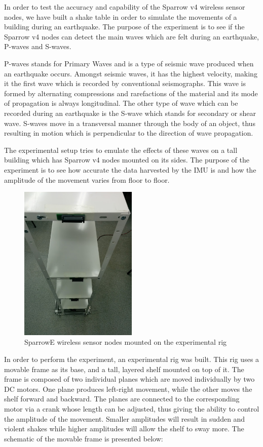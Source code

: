 In order to test the accuracy and capability of the Sparrow v4 wireless sensor nodes, we 
have built a shake table in order to simulate the movements of a building during an earthquake.
The purpose of the experiment is to see if the Sparrow v4 nodes can detect the main waves which 
are felt during an earthquake, P-waves and S-waves.

P-waves stands for Primary Waves and is a type of seismic wave produced when an earthquake occurs.
Amongst seismic waves, it has the highest velocity, making it the first wave which is recorded by 
conventional seismographs. This wave is formed by alternating compressions and rarefactions of the 
material and its mode of propagation is always longitudinal. The other type of wave which can be 
recorded during an earthquake is the S-wave which stands for secondary or shear wave. S-waves move 
in a transversal manner through the body of an object, thus resulting in motion which is perpendicular 
to the direction of wave propagation. 

The experimental setup tries to emulate the effects of these waves on a tall building which has Sparrow v4 
nodes mounted on its sides. The purpose of the experiment is to see how accurate the data harvested by the 
IMU is and how the amplitude of the movement varies from floor to floor.

\begin{figure}[ht] \centering
  \includegraphics[width=0.5\textwidth]{img/mounted-sparrow-nodes.jpg}
  \caption{SparrowE wireless sensor nodes mounted on the experimental rig}
\end{figure}

In order to perform the experiment, an experimental rig was built. This rig uses a movable frame as its base, 
and a tall, layered shelf mounted on top of it. The frame is composed of two individual planes which are moved 
individually by two DC motors. One plane produces left-right movement, while the other moves the shelf forward and 
backward. The planes are connected to the corresponding motor via a crank whose length can be adjusted, thus giving the 
ability to control the amplitude of the movement. Smaller amplitudes will result in sudden and violent shakes while 
higher amplitudes will allow the shelf to sway more. The schematic of the movable frame is presented below:

